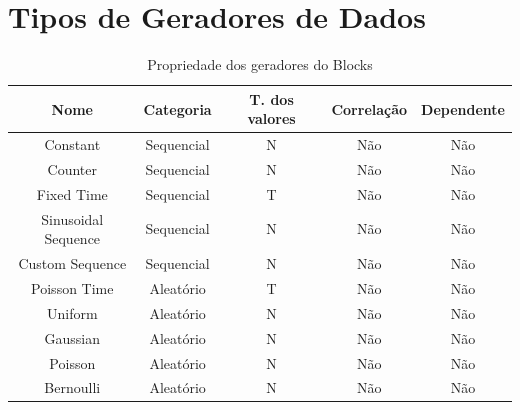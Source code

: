 \documentclass[
	12pt,				%
	openright,			%
	oneside,			%
	a4paper,			%
	english,			%
	brazil				%
	]{abntex2}
\begin{document}
	\section{Tipos de Geradores de Dados}
		\begin{table}[h]
			\centering
			\caption{Propriedade dos geradores do Blocks}
			\vspace{0.5cm}
			\label{table: Propriedade Geradores Blocks}
			\begin{tabular}{c|c|c|c|c}
			
				Nome                 & Categoria  & T. dos valores                                            & Correlação & Dependente \\ %
				\hline %
				Constant             & Sequencial & N\footnotemark[1]                                         & Não        & Não \\
				Counter              & Sequencial & N\footnotemark[1]                                         & Não        & Não \\
				Fixed Time           & Sequencial & T\footnotemark[3]                                         & Não        & Não \\
				Sinusoidal Sequence  & Sequencial & N\footnotemark[1]                                         & Não        & Não \\
				Custom Sequence      & Sequencial & N\footnotemark[1]                                         & Não        & Não \\
				Poisson Time         & Aleatório  & T\footnotemark[3]                                         & Não        & Não \\
				Uniform              & Aleatório  & N\footnotemark[1]                                         & Não        & Não \\
				Gaussian             & Aleatório  & N\footnotemark[1]                                         & Não        & Não \\
				Poisson              & Aleatório  & N\footnotemark[1]                                         & Não        & Não \\
				Bernoulli            & Aleatório  & N\footnotemark[1]                                         & Não        & Não \\

\end{tabular}
\end{table}
\end{document}
